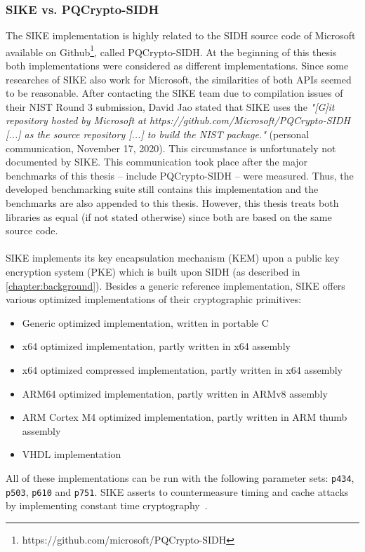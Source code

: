 \subsubsection{SIKE vs. PQCrypto-SIDH}\label{existing:sike_vs_pqcrypto}
The \gls{SIKE} implementation is highly related to the \gls{SIDH} source code of Microsoft available on Github\footnote{https://github.com/microsoft/PQCrypto-SIDH}, called \gls{PQCrypto-SIDH}. At the beginning of this thesis both implementations were considered as different implementations. Since some researches of \gls{SIKE} also work for Microsoft, the similarities of both APIs seemed to be reasonable. After contacting the \gls{SIKE} team due to compilation issues of their NIST Round 3 submission, David Jao stated that \gls{SIKE} uses the \textit{"[G]it repository hosted by Microsoft at
https://github.com/Microsoft/PQCrypto-SIDH [...] as the source
repository [...] to build the NIST package."} (personal communication, November 17, 2020). This circumstance is unfortunately not documented by \gls{SIKE}. This communication took place after the major benchmarks of this thesis -- include \gls{PQCrypto-SIDH} -- were measured. Thus, the developed benchmarking suite still contains this implementation and the benchmarks are also appended to this thesis. However, this thesis treats both libraries as equal (if not stated otherwise) since both are based on the same source code.
\\\\
\gls{SIKE} implements its key encapsulation mechanism (\gls{KEM}) upon a public key encryption system (\gls{PKE}) which is built upon \gls{SIDH} (as described in \autoref{chapter:background}). Besides a generic reference implementation, \gls{SIKE} offers various optimized implementations of their cryptographic primitives:
\begin{itemize}
  \item Generic optimized implementation, written in portable C
  \item x64 optimized implementation, partly written in x64 assembly
  \item x64 optimized compressed implementation, partly written in x64 assembly
  \item ARM64 optimized implementation, partly written in ARMv8 assembly
  \item ARM Cortex M4 optimized implementation, partly written in ARM thumb assembly
  \item VHDL implementation
\end{itemize}
All of these implementations can be run with the following parameter sets: \texttt{p434}, \texttt{p503}, \texttt{p610} and \texttt{p751}. \gls{SIKE} asserts to countermeasure timing and cache attacks by implementing constant time cryptography~\parencite{sike2020spec}.

